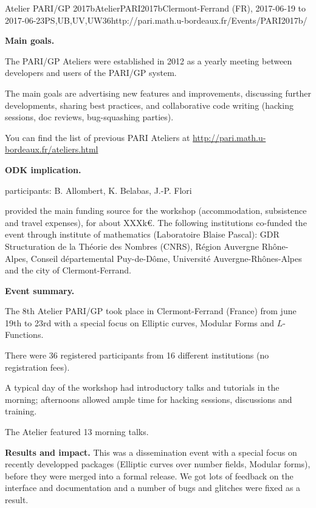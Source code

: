 \begin{event}{Atelier PARI/GP 2017b}{AtelierPARI2017b}{Clermont-Ferrand (FR),
2017-06-19 to 2017-06-23}{PS,UB,UV,UW}{36}{http://pari.math.u-bordeaux.fr/Events/PARI2017b/}

\textbf{Main goals.}

The PARI/GP Ateliers were established in 2012 as a yearly meeting
between developers and users of the PARI/GP system.

The main goals are advertising new features and improvements,
discussing further developments, sharing best practices, and collaborative
code writing (hacking sessions, doc reviews, bug-squashing parties).

You can find the list of previous PARI Ateliers at
\url{http://pari.math.u-bordeaux.fr/ateliers.html}

\textbf{ODK implication.} 

\ODK participants: B. Allombert, K. Belabas, J.-P. Flori

\ODK provided the main funding source for the workshop (accommodation,
subsistence and travel expenses), for about XXXk\euro. The following
institutions co-funded the event through institute of mathematics (Laboratoire
  Blaise Pascal): GDR Structuration de la Théorie des Nombres (CNRS), Région
  Auvergne Rhône-Alpes, Conseil départemental Puy-de-Dôme, Université
  Auvergne-Rhônes-Alpes and the city of Clermont-Ferrand.

\textbf{Event summary.} 

The 8th Atelier PARI/GP took place in Clermont-Ferrand (France) from june
19th to 23rd with a special focus on Elliptic curves, Modular Forms and
$L$-Functions.

There were 36 registered participants from 16 different institutions
(no registration fees).

A typical day of the workshop had introductory talks and tutorials
in the morning; afternoons allowed ample time for hacking sessions,
discussions and training.

The Atelier featured 13 morning talks.

\textbf{Results and impact.} 
This was a dissemination event with a special focus on recently developped
packages (Elliptic curves over number fields, Modular forms), before they were
merged into a formal release. We got lots of feedback on the interface and
documentation and a number of bugs and glitches were fixed as a result.
\end{event}
